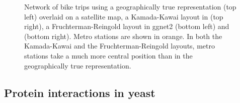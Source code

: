 \begin{figure}[hbtp]
\caption{\label{fig:bikes} Network of bike trips using  a geographically true representation (top left) overlaid on a satellite map, a Kamada-Kawai layout in  (top right), a Fruchterman-Reingold layout in ggnet2 (bottom left) and  (bottom right). Metro stations are shown in orange. In both the Kamada-Kawai and the Fruchterman-Reingold layouts, metro stations take a much more central position than in the geographically true representation. }
\end{figure}



\subsection{Protein interactions in yeast} %

